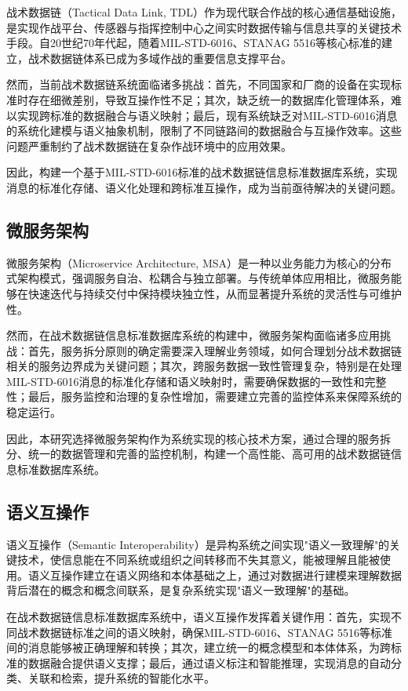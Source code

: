 战术数据链（Tactical Data Link, TDL）作为现代联合作战的核心通信基础设施，是实现作战平台、传感器与指挥控制中心之间实时数据传输与信息共享的关键技术手段。自20世纪70年代起，随着MIL-STD-6016、STANAG 5516等核心标准的建立，战术数据链体系已成为多域作战的重要信息支撑平台。

然而，当前战术数据链系统面临诸多挑战：首先，不同国家和厂商的设备在实现标准时存在细微差别，导致互操作性不足；其次，缺乏统一的数据库化管理体系，难以实现跨标准的数据融合与语义映射；最后，现有系统缺乏对MIL-STD-6016消息的系统化建模与语义抽象机制，限制了不同链路间的数据融合与互操作效率。这些问题严重制约了战术数据链在复杂作战环境中的应用效果。

因此，构建一个基于MIL-STD-6016标准的战术数据链信息标准数据库系统，实现消息的标准化存储、语义化处理和跨标准互操作，成为当前亟待解决的关键问题。

\subsection{微服务架构}

微服务架构（Microservice Architecture, MSA）是一种以业务能力为核心的分布式架构模式，强调服务自治、松耦合与独立部署。与传统单体应用相比，微服务能够在快速迭代与持续交付中保持模块独立性，从而显著提升系统的灵活性与可维护性。

然而，在战术数据链信息标准数据库系统的构建中，微服务架构面临诸多应用挑战：首先，服务拆分原则的确定需要深入理解业务领域，如何合理划分战术数据链相关的服务边界成为关键问题；其次，跨服务数据一致性管理复杂，特别是在处理MIL-STD-6016消息的标准化存储和语义映射时，需要确保数据的一致性和完整性；最后，服务监控和治理的复杂性增加，需要建立完善的监控体系来保障系统的稳定运行。

因此，本研究选择微服务架构作为系统实现的核心技术方案，通过合理的服务拆分、统一的数据管理和完善的监控机制，构建一个高性能、高可用的战术数据链信息标准数据库系统。


\subsection{语义互操作}

语义互操作（Semantic Interoperability）是异构系统之间实现"语义一致理解"的关键技术，使信息能在不同系统或组织之间转移而不失其意义，能被理解且能被使用。语义互操作建立在语义网络和本体基础之上，通过对数据进行建模来理解数据背后潜在的概念和概念间联系，是复杂系统实现"语义一致理解"的基础。

在战术数据链信息标准数据库系统中，语义互操作发挥着关键作用：首先，实现不同战术数据链标准之间的语义映射，确保MIL-STD-6016、STANAG 5516等标准间的消息能够被正确理解和转换；其次，建立统一的概念模型和本体体系，为跨标准的数据融合提供语义支撑；最后，通过语义标注和智能推理，实现消息的自动分类、关联和检索，提升系统的智能化水平。

